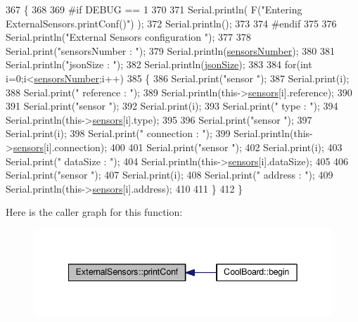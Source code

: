 \begin{DoxyCode}
367 \{
368 
369 \textcolor{preprocessor}{#if DEBUG == 1}
370 
371     Serial.println( F(\textcolor{stringliteral}{"Entering ExternalSensors.printConf()"}) );
372     Serial.println();
373 
374 \textcolor{preprocessor}{#endif }
375 
376     Serial.println(\textcolor{stringliteral}{"External Sensors configuration "});
377 
378     Serial.print(\textcolor{stringliteral}{"sensorsNumber : "});
379     Serial.println(\hyperlink{classExternalSensors_a58e4fbf9adeae787d92be5fa33043b5d}{sensorsNumber});
380 
381     Serial.println(\textcolor{stringliteral}{"jsonSize : "});
382     Serial.println(\hyperlink{classExternalSensors_acacea86d74d967b57fcff282d26cff57}{jsonSize});
383 
384     \textcolor{keywordflow}{for}(\textcolor{keywordtype}{int} i=0;i<\hyperlink{classExternalSensors_a58e4fbf9adeae787d92be5fa33043b5d}{sensorsNumber};i++)
385     \{
386         Serial.print(\textcolor{stringliteral}{"sensor "});
387         Serial.print(i);
388         Serial.print(\textcolor{stringliteral}{" reference : "});
389         Serial.println(this->\hyperlink{classExternalSensors_a284233f884fcf00154a44740cf1d9e1e}{sensors}[i].reference);
390 
391         Serial.print(\textcolor{stringliteral}{"sensor "});
392         Serial.print(i);
393         Serial.print(\textcolor{stringliteral}{" type : "});
394         Serial.println(this->\hyperlink{classExternalSensors_a284233f884fcf00154a44740cf1d9e1e}{sensors}[i].type);
395 
396         Serial.print(\textcolor{stringliteral}{"sensor "});
397         Serial.print(i);
398         Serial.print(\textcolor{stringliteral}{" connection : "});
399         Serial.println(this->\hyperlink{classExternalSensors_a284233f884fcf00154a44740cf1d9e1e}{sensors}[i].connection);
400         
401         Serial.print(\textcolor{stringliteral}{"sensor "});
402         Serial.print(i);
403         Serial.print(\textcolor{stringliteral}{" dataSize : "});
404         Serial.println(this->\hyperlink{classExternalSensors_a284233f884fcf00154a44740cf1d9e1e}{sensors}[i].dataSize);
405         
406         Serial.print(\textcolor{stringliteral}{"sensor "});
407         Serial.print(i);
408         Serial.print(\textcolor{stringliteral}{" address : "});
409         Serial.println(this->\hyperlink{classExternalSensors_a284233f884fcf00154a44740cf1d9e1e}{sensors}[i].address);
410     
411     \}
412 \}
\end{DoxyCode}
Here is the caller graph for this function\+:\nopagebreak
\begin{figure}[H]
\begin{center}
\leavevmode
\includegraphics[width=342pt]{classExternalSensors_a78c2bf55084435dd51d3c559b2d3c6f3_icgraph}
\end{center}
\end{figure}
